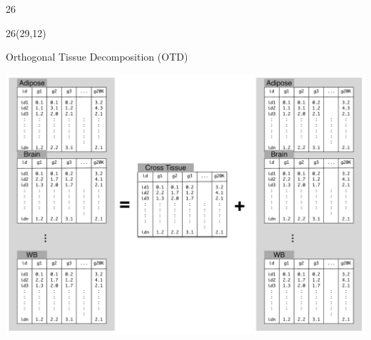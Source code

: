 \documentclass[final]{beamer}
\newcommand{\VcoordTop}{12}
\newcommand{\HcoordSecond}{29}
\newcommand{\ColWidth}{26}
\begin{document}
\begin{frame}{}
\begin{textblock}{\ColWidth}
\end{textblock}

%
%

\begin{textblock}{\ColWidth}(\HcoordSecond,\VcoordTop)

\begin{block}{Orthogonal Tissue Decomposition (OTD)}
	\begin{center}
		\includegraphics[width=\textwidth]{plots/OTD.pdf}
	\end{center}

\end{block}



\end{textblock}
\end{frame}
\end{document}
